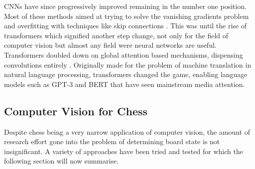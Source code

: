 CNNs have since progressively improved remaining in the number one position.  Most of these methods aimed at trying to solve the vanishing gradients problem \cite{hochreiter1998vanishing}
and overfitting with techniques like skip connections \cite{he2016deep}.
This was until the rise of transformers which signified another step change, not only for the field of computer vision but almost any field
were neural networks are useful.
Transformers doubled down on global attention based mechanisms, dispensing convolutions entirely \cite{vaswani2017attention}.
Originally made for the problem of machine translation in natural language processing, transformers changed the game, enabling language models such as GPT-3 \cite{radford2019language}
and BERT \cite{devlin2018bert} that have seen mainstream media attention.





\subsection{Computer Vision for Chess}
Despite chess being a very narrow application of computer vision, the amount of research effort gone into the problem of determining
board state is not insignificant.
A variety of approaches have been tried and tested for which the following section will now summarise.

